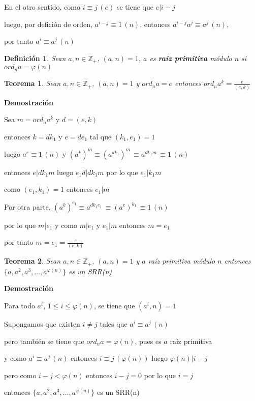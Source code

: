 \documentclass[a4paper,12pt]{report}
\newtheorem*{teo}{Teorema}
\newtheorem*{dfn}{Definición}
\begin{document}
En el otro sentido, como $i \equiv j \, (e)$ se tiene que $e|i-j$

luego, por defición de orden, $a^{i-j} \equiv 1 \, (n)$, entonces $a^{i-j}a^j \equiv a^j \, (n)$,

por tanto $a^i \equiv a^j \, (n)$


\begin{dfn}
 Sean $a,n\in\mathbb{Z}_+$, $(a,n)=1$, $a$ es \textbf{raíz primitiva} módulo $n$ si $ord_na=\varphi(n)$ 
\end{dfn}

\begin{teo}
 Sean $a,n\in\mathbb{Z}_+$, $(a,n)=1$ y $ord_na=e$ entonces $ord_na^k=\frac{e}{(e,k)}$
\end{teo}

\textbf{Demostración}

Sea $m=ord_na^k$  y $d=(e,k)$

entonces $k=dk_1$ y $e=de_1$ tal que $(k_1,e_1)=1$

luego  $a^e \equiv 1 \, (n)$ y  $(a^k)^m \equiv (a^{dk_1})^m \,\equiv a^{dk_1m} \, \equiv 1 \, (n)$

entonces $e|dk_1m$ luego $e_1d|dk_1m$ por lo que $e_1|k_1m$ 

como $(e_1,k_1)=1$ entonces $e_1|m$

Por otra parte, $(a^k)^{e_1} \equiv a^{dk_1e_1} \, \equiv (a^e)^{k_1} \,\equiv 1 \, (n)$

por lo que $m|e_1$ y como  $m|e_1$ y $e_1|m$ entonces $m=e_1$ 

por tanto $m=e_1=\frac{e}{(e,k)}$

\begin{teo}
 Sean $a,n\in\mathbb{Z}_+$, $(a,n)=1$ y $a$ raíz primitiva módulo $n$ entonces
 $\{a,a^2,a^3,\dots,a^{\varphi(n)}\}$ es un SRR(n)
\end{teo}

\textbf{Demostración}

Para todo $a^i$, $1\leq i \leq \varphi(n)$, se tiene que $(a^i,n)=1$

Supongamos que existen $i\neq j$ tales que $a^i \equiv a^j \, (n)$

pero también se tiene que $ord_na=\varphi(n)$, pues es $a$ raíz primitiva

y como $a^i \equiv a^j \, (n)$ entonces $i \equiv j \, (\varphi(n))$ luego $\varphi(n)|i-j$

pero como $i-j<\varphi(n)$ entonces $i-j=0$ por lo que $i=j$ 

entonces  $\{a,a^2,a^3,\dots,a^{\varphi(n)}\}$ es un SRR(n)
\end{document}
